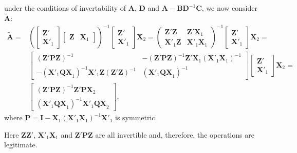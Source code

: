 under the conditions of invertability of $\bm{A}$, $\bm{D}$ and $\bm{A}-\bm{BD}^{-1}\bm{C}$, we now consider $\bm{\tilde{A}}$:
\begin{align*}
\bm{\tilde{A}}=&\left(
\begin{bmatrix}
\bm{Z}'\\
\bm{X}'_{1}
\end{bmatrix}
\begin{bmatrix}
\bm{Z} & \bm{X}_{1}
\end{bmatrix}\right)^{-1}
\begin{bmatrix}
\bm{Z}'\\
\bm{X}'_{1}
\end{bmatrix}\bm{X}_{2}=
\begin{pmatrix}
\bm{Z}'\bm{Z} & \bm{Z}'\bm{X}_{1}\\
\bm{X}'_{1}\bm{Z} & \bm{X}'_{1}\bm{X}_{1}
\end{pmatrix}^{-1}
\begin{bmatrix}
\bm{Z}'\\
\bm{X}'_{1}
\end{bmatrix}\bm{X}_{2}=
\\ &
\begin{bmatrix}
(\bm{Z}'\bm{PZ})^{-1} & -(\bm{Z}'\bm{PZ})^{-1}\bm{Z}'\bm{X}_{1}(\bm{X}'_{1}\bm{X}_{1})^{-1} \\
-(\bm{X}'_{1}\bm{QX}_{1})^{-1}\bm{X}'_{1}\bm{Z}(\bm{Z}'\bm{Z})^{-1} & (\bm{X}'_{1}\bm{QX}_{1})^{-1}
\end{bmatrix}
\begin{bmatrix}
\bm{Z}'\\
\bm{X}'_{1}
\end{bmatrix}\bm{X}_{2}=\\ &
\begin{bmatrix}
(\bm{Z}'\bm{PZ})^{-1}\bm{Z}'\bm{PX}_{2}\\
(\bm{X}'_{1}\bm{QX}_{1})^{-1}\bm{X}'_{1}\bm{QX}_{2}
\end{bmatrix}, 
\end{align*}
where $\bm{P}=\bm{I}-\bm{X}_{1}(\bm{X}'_{1}\bm{X}_{1})^{-1}\bm{X}'_{1}$ is symmetric.

Here $\bm{ZZ}'$, $\bm{X}'_{1}\bm{X}_{1}$ and $\bm{Z}'\bm{PZ}$ are all invertible and, therefore, the operations are legitimate. 

